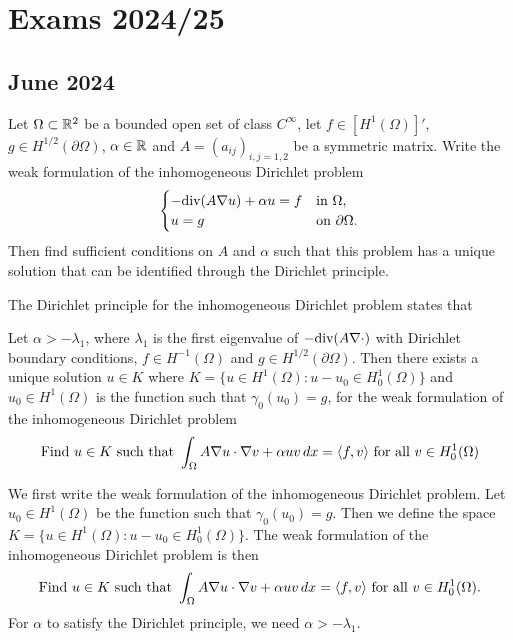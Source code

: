 \section{Exams 2024/25}
\subsection{June 2024}
\begin{exercise}
    Let \(\Omega \subset \mathbb{R}^2\) be a bounded open set of class \(C^\infty\), let \(f \in \left[H^1(\Omega)\right]'\), \(g \in H^{1/2}(\partial \Omega)\), \(\alpha \in \mathbb{R}\) and \(A = (a_{ij})_{i, j=1,2}\) be a symmetric matrix. Write the weak formulation of the inhomogeneous Dirichlet problem
    \[
        \begin{cases}
            -\text{div}(A \nabla u) + \alpha u = f & \text{in } \Omega,          \\
            u = g                           & \text{on } \partial \Omega.
        \end{cases}
    \]
    Then find sufficient conditions on \(A\) and \(\alpha\) such that this problem
    has a unique solution that can be identified through the Dirichlet principle.
\end{exercise}
The Dirichlet principle for the inhomogeneous Dirichlet problem states that
\begin{remark}
    Let \(\alpha > -\lambda_1\), where \(\lambda_1\) is the first eigenvalue of \(-\text{div}(A \nabla \cdot)\) with Dirichlet boundary conditions, \(f \in H^{-1}(\Omega)\) and \(g \in H^{1/2}(\partial \Omega)\). Then there exists a unique solution \(u \in K\) where \(K = \{u \in H^1(\Omega) : u-u_0 \in H^1_0(\Omega)\}\) and \(u_0 \in H^1(\Omega)\) is the function such that \(\gamma_0(u_0) = g\), for the weak formulation of the inhomogeneous Dirichlet problem
    \[
        \begin{split}
            \text{Find } u \in K \text{ such that } \int_\Omega A \nabla u \cdot \nabla v + \alpha u v \, dx = \langle f, v \rangle \text{ for all } v \in H^1_0(\Omega)
        \end{split}
    \]
\end{remark}
We first write the weak formulation of the inhomogeneous Dirichlet problem. Let \(u_0 \in H^1(\Omega)\) be the function such that \(\gamma_0(u_0) = g\). Then we define the space \(K = \{u \in H^1(\Omega) : u-u_0 \in H^1_0(\Omega)\}\). The weak formulation of the inhomogeneous Dirichlet problem is then
\[
    \begin{split}
        \text{Find } u \in K \text{ such that } \int_\Omega A \nabla u \cdot \nabla v + \alpha u v \, dx = \langle f, v \rangle \text{ for all } v \in H^1_0(\Omega).
    \end{split}
\]
For \(\alpha\) to satisfy the Dirichlet principle, we need \(\alpha >
-\lambda_1\).


